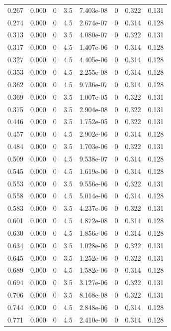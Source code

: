 \documentclass[preview]{standalone}
\begin{document}
{{\begin{tabular}{L{1.2cm}C{1.2cm} C{0.3cm}C{0.5cm} C{1.4cm}C{1.4cm} C{1.4cm}C{1.4cm}}
  0.267  &  0.000  & 0     & 3.5 &  7.403e-08  & 0  & 0.322 &  0.131   \\ 
  0.274  &  0.000  & 0     & 4.5 &  2.674e-07  & 0  & 0.314 &  0.128   \\ 
  0.313  &  0.000  & 0     & 3.5 &  4.080e-07  & 0  & 0.322 &  0.131   \\ 
  0.317  &  0.000  & 0     & 4.5 &  1.407e-06  & 0  & 0.314 &  0.128   \\ 
  0.327  &  0.000  & 0     & 4.5 &  4.405e-06  & 0  & 0.314 &  0.128   \\ 
  0.353  &  0.000  & 0     & 4.5 &  2.255e-08  & 0  & 0.314 &  0.128   \\ 
  0.362  &  0.000  & 0     & 4.5 &  9.736e-07  & 0  & 0.314 &  0.128   \\ 
  0.369  &  0.000  & 0     & 3.5 &  1.007e-05  & 0  & 0.322 &  0.131   \\ 
  0.375  &  0.000  & 0     & 3.5 &  2.904e-08  & 0  & 0.322 &  0.131   \\ 
  0.446  &  0.000  & 0     & 3.5 &  1.752e-05  & 0  & 0.322 &  0.131   \\ 
  0.457  &  0.000  & 0     & 4.5 &  2.902e-06  & 0  & 0.314 &  0.128   \\ 
  0.484  &  0.000  & 0     & 3.5 &  1.703e-06  & 0  & 0.322 &  0.131   \\ 
  0.509  &  0.000  & 0     & 4.5 &  9.538e-07  & 0  & 0.314 &  0.128   \\ 
  0.545  &  0.000  & 0     & 4.5 &  1.619e-06  & 0  & 0.314 &  0.128   \\ 
  0.553  &  0.000  & 0     & 3.5 &  9.556e-06  & 0  & 0.322 &  0.131   \\ 
  0.558  &  0.000  & 0     & 4.5 &  5.014e-06  & 0  & 0.314 &  0.128   \\ 
  0.583  &  0.000  & 0     & 3.5 &  4.237e-06  & 0  & 0.322 &  0.131   \\ 
  0.601  &  0.000  & 0     & 4.5 &  4.872e-08  & 0  & 0.314 &  0.128   \\ 
  0.630  &  0.000  & 0     & 4.5 &  1.856e-06  & 0  & 0.314 &  0.128   \\ 
  0.634  &  0.000  & 0     & 3.5 &  1.028e-06  & 0  & 0.322 &  0.131   \\ 
  0.645  &  0.000  & 0     & 3.5 &  1.252e-06  & 0  & 0.322 &  0.131   \\ 
  0.689  &  0.000  & 0     & 4.5 &  1.582e-06  & 0  & 0.314 &  0.128   \\ 
  0.694  &  0.000  & 0     & 3.5 &  3.127e-06  & 0  & 0.322 &  0.131   \\ 
  0.706  &  0.000  & 0     & 3.5 &  8.168e-08  & 0  & 0.322 &  0.131   \\ 
  0.744  &  0.000  & 0     & 4.5 &  2.848e-06  & 0  & 0.314 &  0.128   \\ 
  0.771  &  0.000  & 0     & 4.5 &  2.410e-06  & 0  & 0.314 &  0.128   \\ 
\hline 
\end{tabular} 

}}
\end{document}

